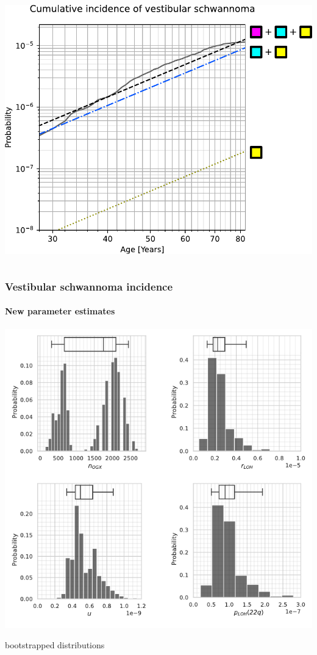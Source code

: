 \documentclass{beamer}
\begin{document}
\begin{frame}
\begin{columns}
\begin{column}{0.5\textwidth}
            \includegraphics[width=1.0\textwidth]{figures/figure-5-3Hit-feb22}
        \end{column}
    \end{columns}
\end{frame}

\begin{frame}
    \frametitle{Vestibular schwannoma incidence}
    \framesubtitle{New parameter estimates}

    \begin{center}
    \includegraphics[height=0.85\textheight]{figures/Fig3-combined-bw-feb22}

    \;

        \tiny{bootstrapped distributions}
    \end{center}
\end{frame}
\end{document}
